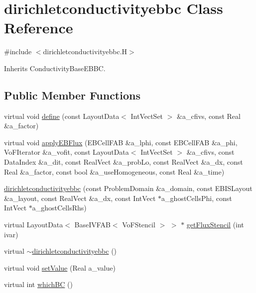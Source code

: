 \hypertarget{classdirichletconductivityebbc}{}\section{dirichletconductivityebbc Class Reference}
\label{classdirichletconductivityebbc}


{\ttfamily \#include $<$dirichletconductivityebbc.\+H$>$}



Inherits Conductivity\+Base\+E\+B\+BC.

\subsection*{Public Member Functions}
\begin{DoxyCompactItemize}
\item 
virtual void \hyperlink{classdirichletconductivityebbc_a3a98e8158692089f23cd6052cea9b28d}{define} (const Layout\+Data$<$ Int\+Vect\+Set $>$ \&a\+\_\+cfivs, const Real \&a\+\_\+factor)
\item 
virtual void \hyperlink{classdirichletconductivityebbc_ab977d61f0d42491c986432d8c15367a7}{apply\+E\+B\+Flux} (E\+B\+Cell\+F\+AB \&a\+\_\+lphi, const E\+B\+Cell\+F\+AB \&a\+\_\+phi, Vo\+F\+Iterator \&a\+\_\+vofit, const Layout\+Data$<$ Int\+Vect\+Set $>$ \&a\+\_\+cfivs, const Data\+Index \&a\+\_\+dit, const Real\+Vect \&a\+\_\+prob\+Lo, const Real\+Vect \&a\+\_\+dx, const Real \&a\+\_\+factor, const bool \&a\+\_\+use\+Homogeneous, const Real \&a\+\_\+time)
\item 
\hyperlink{classdirichletconductivityebbc_a3f0e611c207df002d88ab4cfc6098176}{dirichletconductivityebbc} (const Problem\+Domain \&a\+\_\+domain, const E\+B\+I\+S\+Layout \&a\+\_\+layout, const Real\+Vect \&a\+\_\+dx, const Int\+Vect $\ast$a\+\_\+ghost\+Cells\+Phi, const Int\+Vect $\ast$a\+\_\+ghost\+Cells\+Rhs)
\item 
virtual Layout\+Data$<$ Base\+I\+V\+F\+AB$<$ Vo\+F\+Stencil $>$ $>$ $\ast$ \hyperlink{classdirichletconductivityebbc_a72d18cf3aae353be5a0441f369d2bca9}{get\+Flux\+Stencil} (int ivar)
\item 
virtual \hyperlink{classdirichletconductivityebbc_adca8c6840262139f4352c74d1b9ab52b}{$\sim$dirichletconductivityebbc} ()
\item 
virtual void \hyperlink{classdirichletconductivityebbc_adf425a52a10ccb8ceecec591018ba63e}{set\+Value} (Real a\+\_\+value)
\item 
virtual int \hyperlink{classdirichletconductivityebbc_ab877198c222f5cbf6d5cac40e62396ec}{which\+BC} ()

\end{DoxyCompactItemize}
